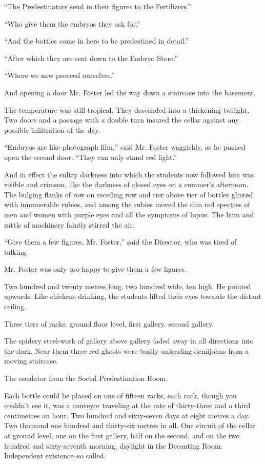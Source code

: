 \documentclass[12pt]{report}
\begin{document}
``The Predestinators send in their figures to the Fertilizers.''

``Who give them the embryos they ask for.''

``And the bottles come in here to be predestined in detail.''

``After which they are sent down to the Embryo Store.''

``Where we now proceed ourselves.''

And opening a door Mr. Foster led the way down a staircase into the
basement.

The temperature was still tropical. They descended into a thickening
twilight. Two doors and a passage with a double turn insured the cellar
against any possible infiltration of the day.

``Embryos are like photograph film,'' said Mr. Foster waggishly, as he
pushed open the second door. ``They can only stand red light.''

And in effect the sultry darkness into which the students now followed
him was visible and crimson, like the darkness of closed eyes on a
summer's afternoon. The bulging flanks of row on receding row and tier
above tier of bottles glinted with innumerable rubies, and among the
rubies moved the dim red spectres of men and women with purple eyes and
all the symptoms of lupus. The hum and rattle of machinery faintly
stirred the air.

``Give them a few figures, Mr. Foster,'' said the Director, who was
tired of talking.

Mr. Foster was only too happy to give them a few figures.

Two hundred and twenty metres long, two hundred wide, ten high. He
pointed upwards. Like chickens drinking, the students lifted their eyes
towards the distant ceiling.

Three tiers of racks: ground floor level, first gallery, second gallery.

The spidery steel-work of gallery above gallery faded away in all
directions into the dark. Near them three red ghosts were busily
unloading demijohns from a moving staircase.

The escalator from the Social Predestination Room.

Each bottle could be placed on one of fifteen racks, each rack, though
you couldn't see it, was a conveyor traveling at the rate of
thirty-three and a third centimetres an hour. Two hundred and
sixty-seven days at eight metres a day. Two thousand one hundred and
thirty-six metres in all. One circuit of the cellar at ground level, one
on the first gallery, half on the second, and on the two hundred and
sixty-seventh morning, daylight in the Decanting Room. Independent
existence--so called.
\end{document}
